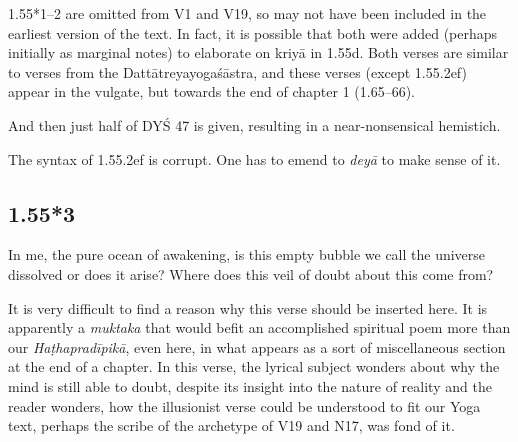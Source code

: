 \begin{ekdosis}
\begin{philcomm}[hp01_055_1]
1.55*1–2 are omitted from V1 and V19, so may not have been included in the earliest version of the text. In fact, it is possible that both were added (perhaps initially as marginal notes) to elaborate on kriyā in 1.55d. Both verses are similar to verses from the Dattātreyayogaśāstra, and these verses (except 1.55.2ef) appear in the vulgate, but towards the end of chapter 1 (1.65–66).

And then just half of DYŚ 47 is given, resulting in a near-nonsensical hemistich.

The syntax of 1.55.2ef is corrupt. One has to emend to \emph{deyā} to make sense of it. 
\end{philcomm}

\subsection*{1.55*3}
\begin{translation}[hp01_055_3]
In me, the pure ocean of awakening, is this empty bubble we call the universe dissolved or does it arise? Where does this veil of doubt about this come from?
\end{translation}

\begin{philcomm}[hp01_055_3]
It is very difficult to find a reason why this verse should be inserted here. It is apparently a
\emph{muktaka} that would befit an accomplished spiritual poem more than our \emph{Haṭhapradīpikā},
even here, in what appears as a sort of miscellaneous section at the end of a chapter.  In this
verse, the lyrical subject wonders about why the mind is still able to doubt, despite its insight
into the nature of reality and the reader wonders, how the illusionist verse could be understood to
fit our Yoga text, perhaps the scribe of the archetype of V19 and N17, was fond of it.


\end{philcomm}
\end{ekdosis}
